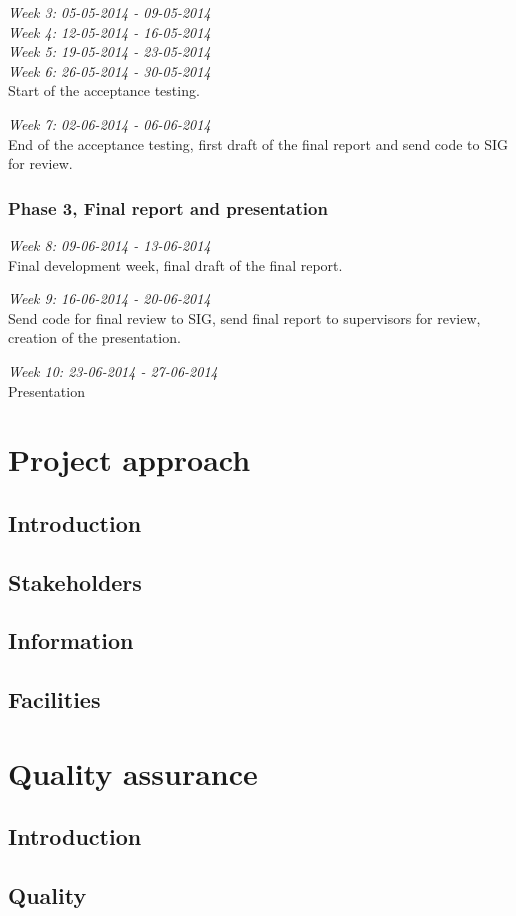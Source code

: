 \documentclass[]{article}
\begin{document}
\noindent\emph{Week 3: 05-05-2014 - 09-05-2014}\\

\noindent\emph{Week 4: 12-05-2014 - 16-05-2014}\\

\noindent\emph{Week 5: 19-05-2014 - 23-05-2014}\\

\noindent\emph{Week 6: 26-05-2014 - 30-05-2014}\\
Start of the acceptance testing.

\noindent\emph{Week 7: 02-06-2014 - 06-06-2014}\\
End of the acceptance testing, first draft of the final report and send code to SIG for review.

\subsubsection{Phase 3, Final report and presentation}

\noindent\emph{Week 8: 09-06-2014 - 13-06-2014}\\
Final development week, final draft of the final report.

\noindent\emph{Week 9: 16-06-2014 - 20-06-2014}\\
Send code for final review to SIG, send final report to supervisors for review, creation of the presentation.

\noindent\emph{Week 10: 23-06-2014 - 27-06-2014}\\
Presentation
\section{Project approach}
\subsection{Introduction}
\subsection{Stakeholders}
\subsection{Information}
\subsection{Facilities}
\section{Quality assurance}
\subsection{Introduction}
\subsection{Quality}

\newpage


\end{document}
